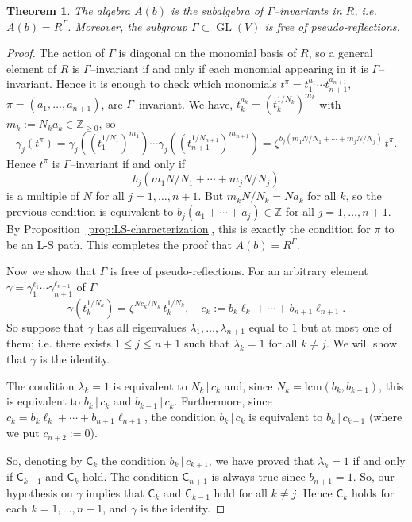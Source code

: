 \documentclass[12pt, a4paper]{amsart}   	%
\numberwithin{equation}{section}
\theoremstyle{plain}
\newtheorem{theorem}{Theorem}[section]
\theoremstyle{definition}
\DeclareMathOperator{\GL}{GL}
\newcommand{\ZZ}{\mathbb{Z}}
\begin{document}
\begin{theorem}\label{thm:invariant-ring-Gamma}
The algebra $A(b)$ is the subalgebra of $\Gamma$--invariants in $ R$, i.e. $A(b) =  R^{\Gamma}$. Moreover, the subgroup $\Gamma \subset \GL( V)$ is free of pseudo-reflections.
\end{theorem}
\begin{proof}
The action of $\Gamma$ is diagonal on the monomial basis of $R$, so a general element of $R$ is $\Gamma$--invariant if and only if each monomial appearing in it is $\Gamma$--invariant. Hence it is enough to check which monomials $t^\pi = t_1^{a_1}\cdots t_{n+1}^{a_{n+1}}$, $\pi = (a_1, \ldots,a_{n+1})$, are $\Gamma$--invariant.
We have, $t_k^{a_k} = (t_k^{1/N_k})^{m_k}$ with $m_k := N_k a_k \in \ZZ_{\ge 0}$, so
\[
\gamma_j(t^\pi) = \gamma_j((t_1^{1/N_1})^{m_1})\cdots \gamma_j((t_{n+1}^{1/N_{n+1}})^{m_{n+1}}) = \zeta^{b_j(m_1N/N_1 + \cdots + m_jN/N_j)}\, t^\pi.
\]
Hence $t^\pi$ is $\Gamma$--invariant if and only if
\[
b_j(m_1N/N_1 + \cdots + m_jN/N_j)
\]
is a multiple of $N$ for all $j = 1, \ldots, n+1$. But $m_kN/N_k = N a_k$ for all $k$, so the previous condition is equivalent to $b_j(a_1 + \cdots + a_j) \in \ZZ$ for all $j = 1, \ldots, n+1$. By Proposition~\ref{prop:LS-characterization}, this is exactly the condition for $\pi$ to be an L-S path. This completes the proof that $A(b) =  R^{\Gamma}$.

Now we show that $\Gamma$ is free of pseudo-reflections. For an arbitrary element $\gamma = \gamma_1^{\ell_1}\cdots \gamma_{n+1}^{\ell_{n+1}}$ of $\Gamma$
\[
\gamma(t_k^{1/N_k}) = \zeta^{N c_k /N_k}\, t_k^{1/N_k},\quad c_k := b_k \ell_k + \cdots + b_{n+1} \ell_{n+1}.
\]
So suppose that $\gamma$ has all eigenvalues $\lambda_1, \ldots, \lambda_{n+1}$ equal to $1$ but at most one of them; i.e. there exists $1\leq j\leq n+1$ such that $\lambda_k = 1$ for all $k\neq j$. We will show that $\gamma$ is the identity.

The condition $\lambda_k = 1$ is equivalent to $N_k\,|\,c_k$ and, since $N_k = \mathrm{lcm}(b_k,b_{k-1})$, this is equivalent to $b_k\,|\,c_k$ and $b_{k - 1}\,|\,c_k$. Furthermore, since $c_k = b_k\ell_k + \cdots + b_{n+1}\ell_{n+1}$, the condition $b_k\,|\,c_k$ is equivalent to $b_k\,|\,c_{k+1}$ (where we put $c_{n+2} := 0$).

So, denoting by ${\mathsf C}_k$ the condition $b_k\,|\,c_{k+1}$, we have proved that $\lambda_k = 1$ if and only if ${\mathsf C}_{k-1}$ and ${\mathsf C}_k$ hold. The condition ${\mathsf C}_{n+1}$ is always true since $b_{n+1} = 1$. So, our hypothesis on $\gamma$ implies that ${\mathsf C}_k$ and ${\mathsf C}_{k-1}$ hold for all $k\neq j$. Hence ${\mathsf C}_k$ holds for each $k=1,\ldots,n+1$, and $\gamma$ is the identity.
\end{proof}
\end{document}
